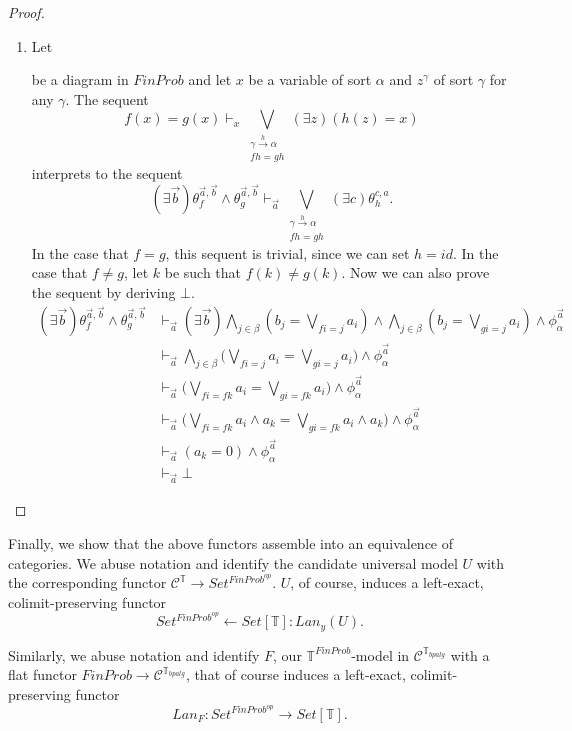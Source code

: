 \documentclass[a4paper]{amsproc}
\theoremstyle{plain}
\theoremstyle{definition}
\theoremstyle{remark}
\numberwithin{equation}{section}
\begin{document}
\begin{proof}
\begin{enumerate}
\item Let
be a diagram in $FinProb$ and let $x$ be a variable of sort $\alpha$ and $z^{\gamma}$ of sort $\gamma$ for any $\gamma$. The sequent
\[
f(x) = g(x) \vdash_x \bigvee_{\substack{\gamma \xrightarrow{h} \alpha \\ fh = gh}} (\exists z)(h(z) = x)
\]
interprets to the sequent
\[
(\exists \vec{b}) \theta_f^{\vec{a},\vec{b}} \wedge \theta_g^{\vec{a},\vec{b}} \vdash_{\vec{a}} \bigvee_{\substack{\gamma \xrightarrow{h} \alpha \\ fh = gh}} (\exists c) \theta_h^{c,a} .
\]
In the case that $f=g$, this sequent is trivial, since we can set $h = id$. In the case that $f \neq g$, let $k$ be such that $f(k) \neq g(k)$. Now we can also prove the sequent by deriving $\bot$.
\begin{align*}
(\exists \vec{b}) \theta_f^{\vec{a},\vec{b}} \wedge \theta_g^{\vec{a},\vec{b}}
&\vdash_{\vec{a}} (\exists \vec{b}) \bigwedge_{j \in \beta} (b_j = \bigvee_{f i = j} a_i) \wedge \bigwedge_{j \in \beta} (b_j = \bigvee_{g i = j} a_i) \wedge \phi_{\alpha}^{\vec{a}} \\
&\vdash_{\vec{a}} \bigwedge_{j \in \beta} \big ( \bigvee_{f i = j} a_i = \bigvee_{g i = j} a_i \big ) \wedge \phi_{\alpha}^{\vec{a}} \\
&\vdash_{\vec{a}} \big ( \bigvee_{f i = f k} a_i = \bigvee_{g i = f k} a_i \big ) \wedge \phi_{\alpha}^{\vec{a}} \\
&\vdash_{\vec{a}} \big ( \bigvee_{f i = f k} a_i \wedge a_k = \bigvee_{g i = f k} a_i \wedge a_k \big ) \wedge \phi_{\alpha}^{\vec{a}}\\
&\vdash_{\vec{a}} (a_k = 0) \wedge \phi_{\alpha}^{\vec{a}} \\
&\vdash_{\vec{a}} \bot
\end{align*}
\end{enumerate}
\end{proof}

Finally, we show that the above functors assemble into an equivalence of categories. We abuse notation and identify the candidate universal model $U$ with the corresponding functor $\mathcal{C}^{\mathbb{T}} \to Set^{FinProb^{op}}$. $U$, of course, induces a left-exact, colimit-preserving functor
\[
Set^{FinProb^{op}} \leftarrow Set[\mathbb{T}]: Lan_y(U).
\]

Similarly, we abuse notation and identify $F$, our $\mathbb{T}^{FinProb}$-model in $\mathcal{C}^{\mathbb{T}_{bpalg}}$ with a flat functor $FinProb \to \mathcal{C}^{\mathbb{T}_{bpalg}}$, that of course induces a left-exact, colimit-preserving functor
\[
Lan_F: Set^{FinProb^{op}} \to Set[\mathbb{T}].
\]
\end{document}
